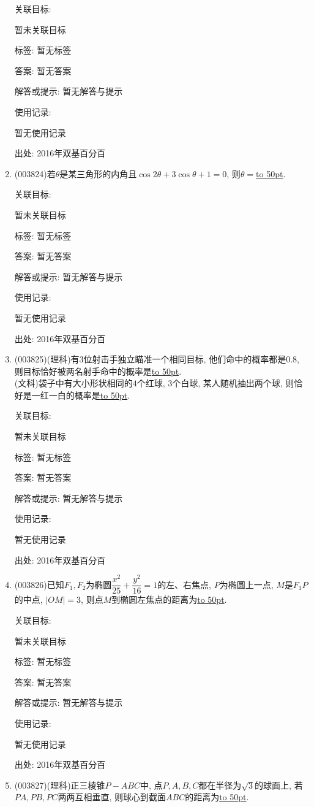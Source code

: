 \documentclass[10pt,a4paper]{article}
\newcommand{\blank}[1]{\underline{\hbox to #1pt{}}}
\begin{document}
\begin{enumerate}[1.]
关联目标:

暂未关联目标



标签: 暂无标签

答案: 暂无答案

解答或提示: 暂无解答与提示

使用记录:

暂无使用记录


出处: 2016年双基百分百
\item { (003824)}若$\theta$是某三角形的内角且$\cos2\theta+3\cos\theta+1=0$, 则$\theta=$\blank{50}.


关联目标:

暂未关联目标



标签: 暂无标签

答案: 暂无答案

解答或提示: 暂无解答与提示

使用记录:

暂无使用记录


出处: 2016年双基百分百
\item { (003825)}(理科)有$3$位射击手独立瞄准一个相同目标, 他们命中的概率都是$0.8$, 则目标恰好被两名射手命中的概率是\blank{50}.\\
(文科)袋子中有大小形状相同的$4$个红球, $3$个白球, 某人随机抽出两个球, 则恰好是一红一白的概率是\blank{50}.


关联目标:

暂未关联目标



标签: 暂无标签

答案: 暂无答案

解答或提示: 暂无解答与提示

使用记录:

暂无使用记录


出处: 2016年双基百分百
\item { (003826)}已知$F_1,F_2$为椭圆$\dfrac{x^2}{25}+\dfrac{y^2}{16}=1$的左、右焦点, $P$为椭圆上一点, $M$是$F_1P$的中点, $|OM|=3$, 则点$M$到椭圆左焦点的距离为\blank{50}.


关联目标:

暂未关联目标



标签: 暂无标签

答案: 暂无答案

解答或提示: 暂无解答与提示

使用记录:

暂无使用记录


出处: 2016年双基百分百
\item { (003827)}(理科)正三棱锥$P-ABC$中, 点$P,A,B,C$都在半径为$\sqrt{3}$的球面上, 若$PA,PB,PC$两两互相垂直, 则球心到截面$ABC$的距离为\blank{50}.



\end{enumerate}
\end{document}
